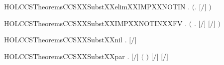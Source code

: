 \newcommand{\HOLCCSTheoremsCCSXXSubstXXelim}{\UseVerbatim{HOLCCSTheoremsCCSXXSubstXXelim}}
\begin{SaveVerbatim}{HOLCCSTheoremsCCSXXSubstXXelimXXIMPXXNOTIN}
\HOLTokenTurnstile{} \HOLSymConst{\HOLTokenForall{}} . \ensuremath{(}\HOLSymConst{\HOLTokenForall{}}. \ensuremath{[}\ensuremath{/}\ensuremath{]}  \HOLSymConst{\ensuremath{=}} \ensuremath{)} \HOLSymConst{\HOLTokenImp{}}  \HOLConst{\HOLTokenNotIn{}}  
\end{SaveVerbatim}
\newcommand{\HOLCCSTheoremsCCSXXSubstXXelimXXIMPXXNOTIN}{\UseVerbatim{HOLCCSTheoremsCCSXXSubstXXelimXXIMPXXNOTIN}}
\begin{SaveVerbatim}{HOLCCSTheoremsCCSXXSubstXXIMPXXNOTINXXFV}
\HOLTokenTurnstile{} \HOLSymConst{\HOLTokenForall{}} . \ensuremath{(}\HOLSymConst{\HOLTokenForall{}} . \ensuremath{[}\ensuremath{/}\ensuremath{]}  \HOLSymConst{\ensuremath{=}} \ensuremath{[}\ensuremath{/}\ensuremath{]} \ensuremath{)} \HOLSymConst{\HOLTokenImp{}}  \HOLConst{\HOLTokenNotIn{}}  
\end{SaveVerbatim}
\newcommand{\HOLCCSTheoremsCCSXXSubstXXIMPXXNOTINXXFV}{\UseVerbatim{HOLCCSTheoremsCCSXXSubstXXIMPXXNOTINXXFV}}
\begin{SaveVerbatim}{HOLCCSTheoremsCCSXXSubstXXnil}
\HOLTokenTurnstile{} \HOLSymConst{\HOLTokenForall{}} . \ensuremath{[}\ensuremath{/}\ensuremath{]}  \HOLSymConst{\ensuremath{=}} 
\end{SaveVerbatim}
\newcommand{\HOLCCSTheoremsCCSXXSubstXXnil}{\UseVerbatim{HOLCCSTheoremsCCSXXSubstXXnil}}
\begin{SaveVerbatim}{HOLCCSTheoremsCCSXXSubstXXpar}
\HOLTokenTurnstile{} \HOLSymConst{\HOLTokenForall{}}   . \ensuremath{[}\ensuremath{/}\ensuremath{]} \ensuremath{(} \HOLSymConst{\ensuremath{\mid}} \ensuremath{)} \HOLSymConst{\ensuremath{=}} \ensuremath{[}\ensuremath{/}\ensuremath{]}  \HOLSymConst{\ensuremath{\mid}} \ensuremath{[}\ensuremath{/}\ensuremath{]} 
\end{SaveVerbatim}
